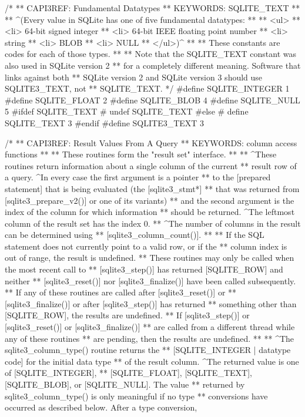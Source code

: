 \begin{Codex}[label=sqlite3.h,numbers=left]
{/*
** CAPI3REF: Fundamental Datatypes
** KEYWORDS: SQLITE_TEXT
**
** ^(Every value in SQLite has one of five fundamental datatypes:
**
** <ul>
** <li> 64-bit signed integer
** <li> 64-bit IEEE floating point number
** <li> string
** <li> BLOB
** <li> NULL
** </ul>)^
**
** These constants are codes for each of those types.
**
** Note that the SQLITE_TEXT constant was also used in SQLite version 2
** for a completely different meaning.  Software that links against both
** SQLite version 2 and SQLite version 3 should use SQLITE3_TEXT, not
** SQLITE_TEXT.
*/
#define SQLITE_INTEGER  1
#define SQLITE_FLOAT    2
#define SQLITE_BLOB     4
#define SQLITE_NULL     5
#ifdef SQLITE_TEXT
# undef SQLITE_TEXT
#else
# define SQLITE_TEXT     3
#endif
#define SQLITE3_TEXT     3

/*
** CAPI3REF: Result Values From A Query
** KEYWORDS: {column access functions}
**
** These routines form the "result set" interface.
**
** ^These routines return information about a single column of the current
** result row of a query.  ^In every case the first argument is a pointer
** to the [prepared statement] that is being evaluated (the [sqlite3_stmt*]
** that was returned from [sqlite3_prepare_v2()] or one of its variants)
** and the second argument is the index of the column for which information
** should be returned. ^The leftmost column of the result set has the index 0.
** ^The number of columns in the result can be determined using
** [sqlite3_column_count()].
**
** If the SQL statement does not currently point to a valid row, or if the
** column index is out of range, the result is undefined.
** These routines may only be called when the most recent call to
** [sqlite3_step()] has returned [SQLITE_ROW] and neither
** [sqlite3_reset()] nor [sqlite3_finalize()] have been called subsequently.
** If any of these routines are called after [sqlite3_reset()] or
** [sqlite3_finalize()] or after [sqlite3_step()] has returned
** something other than [SQLITE_ROW], the results are undefined.
** If [sqlite3_step()] or [sqlite3_reset()] or [sqlite3_finalize()]
** are called from a different thread while any of these routines
** are pending, then the results are undefined.
**
** ^The sqlite3_column_type() routine returns the
** [SQLITE_INTEGER | datatype code] for the initial data type
** of the result column.  ^The returned value is one of [SQLITE_INTEGER],
** [SQLITE_FLOAT], [SQLITE_TEXT], [SQLITE_BLOB], or [SQLITE_NULL].  The value
** returned by sqlite3_column_type() is only meaningful if no type
** conversions have occurred as described below.  After a type conversion,
}
\end{Codex}
